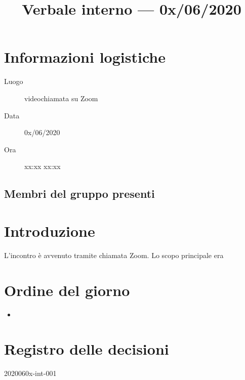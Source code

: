\documentclass{article}
\title{Verbale interno --- 0x/06/2020} %
\begin{document}


\section{Informazioni logistiche}%
\label{sec:informazioni_logistiche}

\begin{description}
  \item [Luogo] videochiamata su Zoom
  \item [Data] 0x/06/2020 %
  \item [Ora] xx:xx  xx:xx %
\end{description}

\subsection{Membri del gruppo presenti}%
\label{sub:membri_del_gruppo_presenti}

\begin{enumerate}
\end{enumerate}

\section{Introduzione}%
\label{sec:introduzione}
L'incontro è avvenuto tramite chiamata Zoom.
Lo scopo principale era %

\section{Ordine del giorno}%
\label{sec:ordine_del_giorno}

\begin{itemize}
  \item %
\end{itemize}

\section{}%
\label{sec:}

\newpage
\section{Registro delle decisioni}%
\label{sec:registro_delle_decisioni}

\begin{description}
  \item[2020060x-int-001] %
\end{description}

\end{document}
